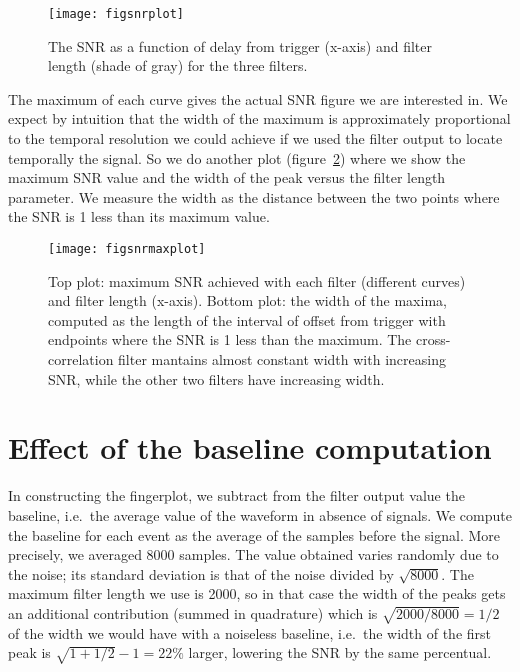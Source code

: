 \begin{figure}
    \hspace{-0.26\textwidth}
    \texttt{[image: figsnrplot]}
    
    \caption{The SNR as a function of delay from trigger (x-axis) and filter
    length (shade of gray) for the three filters.}
    
    \label{fig:snrplot}
\end{figure}

The maximum of each curve gives the actual SNR figure we are interested in. We
expect by intuition that the width of the maximum is approximately proportional
to the temporal resolution we could achieve if we used the filter output to
locate temporally the signal. So we do another plot
(figure~\ref{fig:snrmaxplot}) where we show the maximum SNR value and the width
of the peak versus the filter length parameter. We measure the width as the
distance between the two points where the SNR is 1 less than its maximum value.

\begin{figure}
    \hspace{0.00\textwidth}
    \texttt{[image: figsnrmaxplot]}
    
    \caption{Top plot: maximum SNR achieved with each filter (different curves)
    and filter length (x-axis). Bottom plot: the width of the maxima, computed
    as the length of the interval of offset from trigger with endpoints where
    the SNR is 1 less than the maximum. The cross-correlation filter mantains
    almost constant width with increasing SNR, while the other two filters
    have increasing width.}
    
    \label{fig:snrmaxplot}
\end{figure}

\section{Effect of the baseline computation}

In constructing the fingerplot, we subtract from the filter output value the
baseline, i.e.\ the average value of the waveform in absence of signals. We
compute the baseline for each event as the average of the samples before the
signal. More precisely, we averaged \num{8000} samples. The value obtained
varies randomly due to the noise; its standard deviation is that of the noise
divided by $\sqrt{8000}$. The maximum filter length we use is 2000, so in that
case the width of the peaks gets an additional contribution (summed in
quadrature) which is $\sqrt{2000/8000} = 1/2$ of the width we would have with a
noiseless baseline, i.e.\ the width of the first peak is $\sqrt{1 + 1/2} - 1 =
\SI{22}\%$ larger, lowering the SNR by the same percentual.

